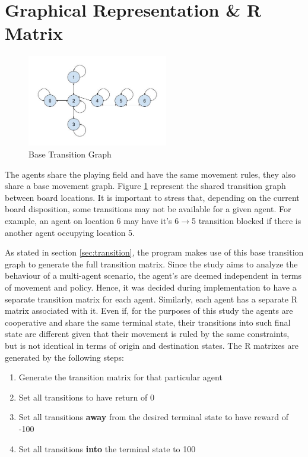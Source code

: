\documentclass[10pt]{article}
\begin{document}
\section{Graphical Representation \& R Matrix} \label{sec:r_matrix}

    \begin{figure}[ht]
        \centering
        \includegraphics[height=4cm]{./Images/4_TransitionGraph.jpg}
        \caption{Base Transition Graph}
        \label{fig:transition_graph}
    \end{figure}

    The agents share the playing field and have the same movement rules, they also share a base movement graph. Figure \ref{fig:transition_graph} represent the shared transition graph between board locations. It is important to stress that, depending on the current board disposition, some transitions may not be available for a given agent. For example, an agent on location 6 may have it's 6$\rightarrow$5 transition blocked if there is another agent occupying location 5.

    As stated in section \ref{sec:transition}, the program makes use of this base transition graph to generate the full transition matrix. Since the study aims to analyze the behaviour of a multi-agent scenario, the agent's are deemed independent in terms of movement and policy. Hence, it was decided during implementation to have a separate transition matrix for each agent. Similarly, each agent has a separate R matrix associated with it. Even if, for the purposes of this study the agents are cooperative and share the same terminal state, their transitions into such final state are different given that their movement is ruled by the same constraints, but is not identical in terms of origin and destination states. The R matrixes are generated by the following steps:
    \begin{enumerate}
        \item Generate the transition matrix for that particular agent
        \item Set all transitions to have return of 0
        \item Set all transitions \textbf{away} from the desired terminal state to have reward of -100
        \item Set all transitions \textbf{into} the terminal state to 100
    \end{enumerate}
\end{document}
